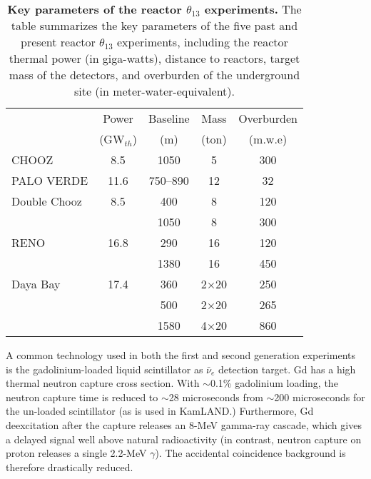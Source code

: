 \documentclass[aps,twocolumn,preprintnumbers,amsmath,superscriptaddress,amssymb,floats,nofootinbib]{revtex4-1}
\begin{document}
\begin{table}[tb]
  \begin{tabular}{lcccc}
  \hline
  & Power & Baseline & Mass & Overburden \\
  & (GW$_{th}$) & (m) & (ton) & (m.w.e)    \\
  \hline
  CHOOZ        & 8.5  & 1050  & 5    & 300\\
  PALO VERDE   & 11.6 & 750--890  & 12  & 32\\
  \hline
  Double Chooz & 8.5  & 400  & 8  & 120\\
               &      & 1050 & 8  & 300\\
  RENO         & 16.8 & 290  & 16   & 120\\
               &      & 1380 & 16   & 450\\
  Daya Bay     & 17.4 & 360  & 2$\times$20   & 250\\
               &      & 500  & 2$\times$20   & 265\\
               &      & 1580 & 4$\times$20   & 860\\
  \hline
  \end{tabular}
  \caption{{\bf Key parameters of the reactor $\theta_{13}$ experiments.} The table summarizes the key parameters of the five past and present reactor $\theta_{13}$ experiments, including the reactor thermal power (in giga-watts), distance to reactors, target mass of the detectors, and overburden of the underground site (in meter-water-equivalent).}
\label{tab:theta13}
\end{table}

A common technology used in both the first and second generation experiments is the gadolinium-loaded liquid scintillator as $\bar\nu_{e}$ detection target. Gd has a high thermal neutron capture cross section. With $\sim$0.1\% gadolinium loading, the neutron capture time is reduced to $\sim$28 microseconds from $\sim$200 microseconds for the un-loaded scintillator (as is used in KamLAND.) Furthermore, Gd deexcitation after the capture releases an 8-MeV gamma-ray cascade, which gives a delayed signal well above natural radioactivity (in contrast, neutron capture on proton releases a single 2.2-MeV $\gamma$). The accidental coincidence background is therefore drastically reduced.
\end{document}

